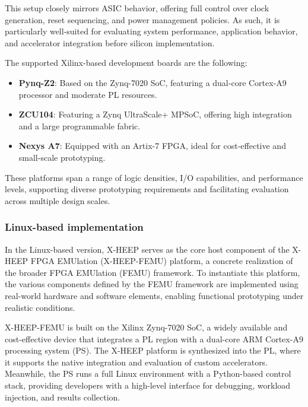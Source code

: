                 This setup closely mirrors ASIC behavior, offering full control over clock generation, reset sequencing, and power management policies. As such, it is particularly well-suited for evaluating system performance, application behavior, and accelerator integration before silicon implementation.
                
                The supported Xilinx-based development boards are the following:

                \vspace{-1em}
                \begin{itemize}
                    \item \textbf{Pynq-Z2}: Based on the Zynq-7020 SoC, featuring a dual-core Cortex-A9 processor and moderate PL resources.
                    
                    \item \textbf{ZCU104}: Featuring a Zynq UltraScale+ MPSoC, offering high integration and a large programmable fabric.
                    
                    \item \textbf{Nexys A7}: Equipped with an Artix-7 FPGA, ideal for cost-effective and small-scale prototyping.
                \end{itemize}
                \vspace{-1em}
                
                These platforms span a range of logic densities, I/O capabilities, and performance levels, supporting diverse prototyping requirements and facilitating evaluation across multiple design scales.
            
            \subsubsection*{Linux-based implementation}
            
                In the Linux-based version, \mbox{X-HEEP} serves as the core host component of the X-HEEP FPGA EMUlation (\mbox{X-HEEP-FEMU}) platform, a concrete realization of the broader FPGA EMUlation (\mbox{FEMU}) framework. To instantiate this platform, the various components defined by the FEMU framework are implemented using real-world hardware and software elements, enabling functional prototyping under realistic conditions.
                
                \mbox{X-HEEP-FEMU} is built on the Xilinx Zynq-7020 SoC, a widely available and cost-effective device that integrates a PL region with a dual-core ARM Cortex-A9 processing system (PS). The \mbox{X-HEEP} platform is synthesized into the PL, where it supports the native integration and evaluation of custom accelerators. Meanwhile, the PS runs a full Linux environment with a Python-based control stack, providing developers with a high-level interface for debugging, workload injection, and results collection.
                
